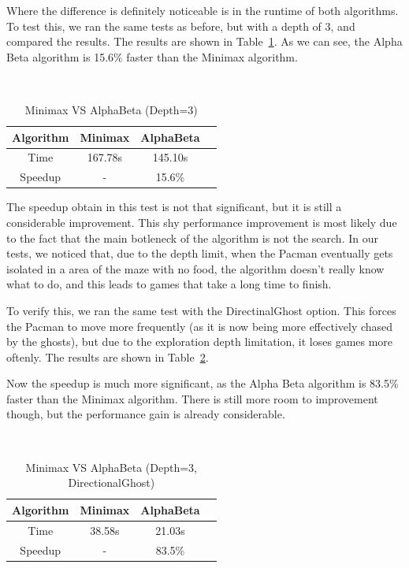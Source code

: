 \documentclass{article}
\begin{document}
Where the difference is definitely noticeable is in the runtime of both algorithms. To test this, we ran the same tests as before, but with a depth of 3, and compared the results. The results are shown in Table~\ref{tab:minimax_vs_alphabeta}. As we can see, the Alpha Beta algorithm is 15.6\% faster than the Minimax algorithm.

~\\
\begin{table}[!ht]
  \begin{center}
    \begin{tabular}{||c||c|c|c||}
      \hline
      Algorithm & Minimax & AlphaBeta \\
      \hline\hline
      Time & 167.78s & 145.10s \\
      \hline\hline
      Speedup & - & 15.6\% \\
      \hline
    \end{tabular}
    \caption{Minimax VS AlphaBeta (Depth=3)}
    \label{tab:minimax_vs_alphabeta}
  \end{center}
\end{table}

The speedup obtain in this test is not that significant, but it is still a considerable improvement. This shy performance improvement is most likely due to the fact that the main botleneck of the algorithm is not the search. In our tests, we noticed that, due to the depth limit, when the Pacman eventually gets isolated in a area of the maze with no food, the algorithm doesn't really know what to do, and this leads to games that take a long time to finish.

To verify this, we ran the same test with the DirectinalGhost option. This forces the Pacman to move more frequently (as it is now being more effectively chased by the ghosts), but due to the exploration depth limitation, it loses games more oftenly. The results are shown in Table~\ref{tab:minimax_vs_alphabeta2}.

Now the speedup is much more significant, as the Alpha Beta algorithm is 83.5\% faster than the Minimax algorithm. There is still more room to improvement though, but the performance gain is already considerable.

~\\
\begin{table}[!ht]
  \begin{center}
    \begin{tabular}{||c||c|c|c||}
      \hline
      Algorithm & Minimax & AlphaBeta \\
      \hline\hline
      Time & 38.58s & 21.03s \\
      \hline\hline
      Speedup & - & 83.5\% \\
      \hline
    \end{tabular}
    \caption{Minimax VS AlphaBeta (Depth=3, DirectionalGhost)}
    \label{tab:minimax_vs_alphabeta2}
  \end{center}
\end{table}
\end{document}
